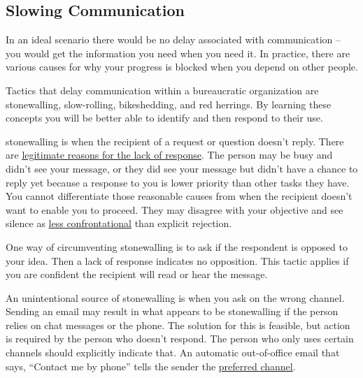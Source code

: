 \subsection*{Slowing Communication\label{sec:slowing-communication}}

In an ideal scenario there would be no delay associated with communication -- you would get the information you need when you need it. In practice, there are various causes for why your progress is blocked when you depend on other people. 

Tactics that delay communication within a bureaucratic organization are stonewalling, slow-rolling, bikeshedding, and red herrings. By learning these concepts you will be better able to identify and then respond to their use.

\Gls{stonewalling} 
is when the recipient of a request or question  doesn't reply. There are \hyperref[sec:email-responsiveness]{legitimate reasons for the lack of response}. 
The person may be busy and didn't see your message, or they did see your message but didn't have a chance to reply yet because a response to you is lower priority than other tasks they have. You cannot differentiate those reasonable causes from when the recipient doesn't want to enable you to proceed. They may disagree with your objective and see silence as \href{https://en.wikipedia.org/wiki/Passive-aggressive_behavior}{less confrontational}
than explicit rejection. 

One way of circumventing stonewalling is to ask if the respondent is opposed to your idea. 
Then a lack of response indicates no opposition. This tactic applies if you are confident the recipient will read or hear the message.

An unintentional source of stonewalling is when you ask on the wrong channel. Sending an email may result in what appears to be stonewalling if the person relies on chat messages or the phone. The solution for this 
is feasible, but action is required by the person who doesn't respond. The person who only uses certain channels should explicitly indicate that. An automatic out-of-office email that says, ``Contact me by phone'' tells the sender the \hyperref[sec:communication-preferences]{preferred channel}. 

